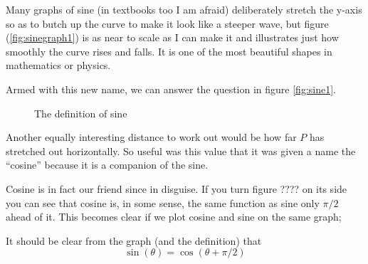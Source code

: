 \documentclass[main.tex]{subfiles}
\begin{document}
Many graphs of sine (in textbooks too I am afraid) deliberately stretch the y-axis so as to butch up the curve to make it look like a steeper wave, but figure (\ref{fig:sinegraph1}) is as near to scale as I can make it and illustrates just how smoothly the curve rises and falls. It is one of the most beautiful shapes in mathematics or physics.

Armed with this new name, we can answer the question in figure \ref{fig:sine1}.

\begin{figure}[H]
  \label{fig:sinename}
  \caption{The definition of sine}
\end{figure}

Another equally interesting distance to work out would be how far $P$ has stretched out horizontally. So useful was this value that it was given a name the ``cosine'' because it is a companion of the sine. 

Cosine is in fact our friend since in disguise. If you turn figure ???? on its side you can see that cosine is, in some sense, the same function as sine only $\pi/2$ ahead of it. This becomes clear if we plot cosine and sine on the same graph;


It should be clear from the graph (and the definition) that 
$$\sin(\theta) = \cos(\theta + \pi/2)$$
\end{document}
